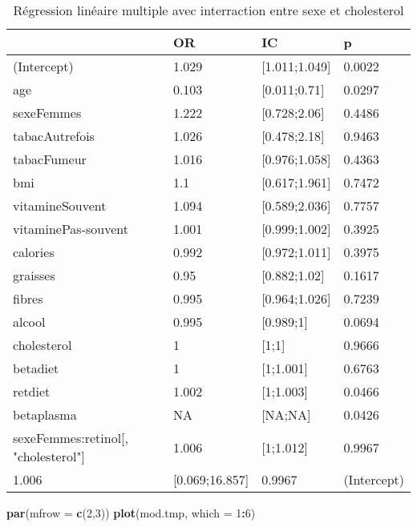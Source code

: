 \documentclass[]{article}
\newenvironment{Shaded}{\begin{snugshade}}{\end{snugshade}}
\newcommand{\KeywordTok}[1]{\textcolor[rgb]{0.13,0.29,0.53}{\textbf{#1}}}
\newcommand{\DataTypeTok}[1]{\textcolor[rgb]{0.13,0.29,0.53}{#1}}
\newcommand{\DecValTok}[1]{\textcolor[rgb]{0.00,0.00,0.81}{#1}}
\newcommand{\OperatorTok}[1]{\textcolor[rgb]{0.81,0.36,0.00}{\textbf{#1}}}
\newcommand{\NormalTok}[1]{#1}
\begin{document}
\begin{table}

\caption{\label{tab:unnamed-chunk-84}Régression linéaire multiple avec interraction entre sexe et cholesterol}
\centering
\begin{tabular}[t]{l|l|l|l}
\hline
  & OR & IC & p\\
\hline
\rowcolor[HTML]{BBD2E1}  (Intercept) & 1.029 & [1.011;1.049] & 0.0022\\
\hline
age & 0.103 & [0.011;0.71] & 0.0297\\
\hline
\rowcolor[HTML]{BBD2E1}  sexeFemmes & 1.222 & [0.728;2.06] & 0.4486\\
\hline
tabacAutrefois & 1.026 & [0.478;2.18] & 0.9463\\
\hline
\rowcolor[HTML]{BBD2E1}  tabacFumeur & 1.016 & [0.976;1.058] & 0.4363\\
\hline
bmi & 1.1 & [0.617;1.961] & 0.7472\\
\hline
\rowcolor[HTML]{BBD2E1}  vitamineSouvent & 1.094 & [0.589;2.036] & 0.7757\\
\hline
vitaminePas-souvent & 1.001 & [0.999;1.002] & 0.3925\\
\hline
\rowcolor[HTML]{BBD2E1}  calories & 0.992 & [0.972;1.011] & 0.3975\\
\hline
graisses & 0.95 & [0.882;1.02] & 0.1617\\
\hline
\rowcolor[HTML]{BBD2E1}  fibres & 0.995 & [0.964;1.026] & 0.7239\\
\hline
alcool & 0.995 & [0.989;1] & 0.0694\\
\hline
\rowcolor[HTML]{BBD2E1}  cholesterol & 1 & [1;1] & 0.9666\\
\hline
betadiet & 1 & [1;1.001] & 0.6763\\
\hline
\rowcolor[HTML]{BBD2E1}  retdiet & 1.002 & [1;1.003] & 0.0466\\
\hline
betaplasma & NA & [NA;NA] & 0.0426\\
\hline
\rowcolor[HTML]{BBD2E1}  sexeFemmes:retinol[, "cholesterol"] & 1.006 & [1;1.012] & 0.9967\\
\hline
1.006 & [0.069;16.857] & 0.9967 & (Intercept)\\
\hline
\end{tabular}
\end{table}

\begin{Shaded}
\begin{Highlighting}[]
\KeywordTok{par}\NormalTok{(}\DataTypeTok{mfrow =} \KeywordTok{c}\NormalTok{(}\DecValTok{2}\NormalTok{,}\DecValTok{3}\NormalTok{))}
\KeywordTok{plot}\NormalTok{(mod.tmp, }\DataTypeTok{which =} \DecValTok{1}\OperatorTok{:}\DecValTok{6}\NormalTok{)}
\end{Highlighting}
\end{Shaded}
\end{document}
